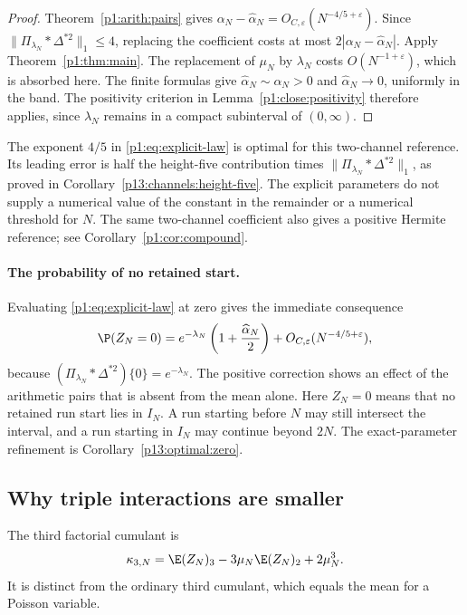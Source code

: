 \begin{proof}
Theorem~\ref{p1:arith:pairs} gives
\(\alpha_N-\widehat\alpha_N=O_{C,\varepsilon}(N^{-4/5+\varepsilon})\).
Since \(\|\Pi_{\lambda_N}*\Delta^{*2}\|_1\le4\), replacing the
coefficient costs at most \(2|\alpha_N-\widehat\alpha_N|\).
Apply Theorem~\ref{p1:thm:main}.
The replacement of \(\mu_N\) by \(\lambda_N\) costs
\(O(N^{-1+\varepsilon})\), which is absorbed here.
The finite formulas give
\(\widehat\alpha_N\sim\alpha_N>0\) and
\(\widehat\alpha_N\to0\), uniformly in the band.
The positivity criterion in Lemma~\ref{p1:close:positivity}
therefore applies, since \(\lambda_N\) remains in a compact
subinterval of \((0,\infty)\).
\end{proof}

The exponent \(4/5\) in \eqref{p1:eq:explicit-law} is optimal
for this two-channel reference. Its leading error is half the
height-five contribution times
\(\|\Pi_{\lambda_N}*\Delta^{*2}\|_1\), as proved in
Corollary~\ref{p13:channels:height-five}.
The explicit parameters do not supply a numerical value of
the constant in the remainder or a numerical threshold for \(N\).
The same two-channel coefficient also gives a positive Hermite
reference; see Corollary~\ref{p1:cor:compound}.

\paragraph{The probability of no retained start.}
Evaluating \eqref{p1:eq:explicit-law} at zero gives the immediate
consequence
\begin{equation}
 \P(Z_N=0)=e^{-\lambda_N}
       \left(1+\frac{\widehat\alpha_N}{2}\right)
       +O_{C,\varepsilon}(N^{-4/5+\varepsilon}),
 \label{p1:eq:no-start}
\end{equation}
because \((\Pi_{\lambda_N}*\Delta^{*2})\{0\}=e^{-\lambda_N}\).
The positive correction shows an effect of the arithmetic pairs
that is absent from the mean alone. Here \(Z_N=0\) means that
no retained run start lies in \(I_N\). A run starting before
\(N\) may still intersect the interval, and a run starting in
\(I_N\) may continue beyond \(2N\).
The exact-parameter refinement is Corollary~\ref{p13:optimal:zero}.

\subsection{Why triple interactions are smaller}

The third factorial cumulant is
\begin{equation}
 \kappa_{3,N}=\E(Z_N)_3-3\mu_N\E(Z_N)_2+2\mu_N^3.
 \label{p13:third:definition}
\end{equation}
It is distinct from the ordinary third cumulant, which equals the mean
for a Poisson variable.

